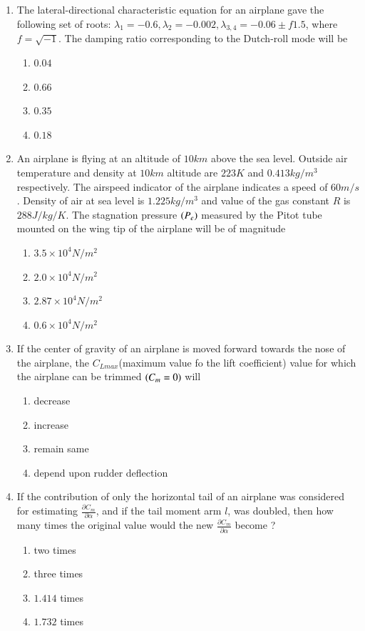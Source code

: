 \documentclass[journal]{IEEEtran}
\begin{document}
\begin{enumerate}
	\item The lateral-directional characteristic equation for an airplane gave the following set of roots: $\lambda _ 1 = -0.6, \lambda _ 2 = -0.002, \lambda _{3,4} = -0.06 \pm f1.5$, where $f = \sqrt{-1}$. The damping ratio corresponding to the Dutch-roll mode will be
		\begin{enumerate}
			\item $0.04$
			\item $0.66$
			\item $0.35$
			\item $0.18$
		\end{enumerate}

	\item An airplane is flying at an altitude of $10km$ above the sea level. Outside air temperature and density at $10km$ altitude are $223 K$ and $0.413 kg/ m^3 $ respectively. The airspeed indicator of the airplane indicates a speed of $60 m/s$. Density of air at sea level is $1.225 kg/m^3$ and value of the gas constant $R$ is $288 J/kg/K$. The stagnation pressure $\left(P_e\right)$ measured by the Pitot tube mounted on the wing tip of the airplane will be of magnitude
		\begin{enumerate}
			\item $3.5 \times 10^4 N/m^2$
			\item $2.0 \times 10^4 N/m^2$
			\item $2.87 \times 10^4 N/m^2$
			\item $0.6 \times 10^4 N/m^2$
		\end{enumerate}

	\item If the center of gravity of an airplane is moved forward towards the nose of the airplane, the $C_{L max}$(maximum value fo the lift coefficient) value for which the airplane can be trimmed $\left(C_m = 0\right)$ will
		\begin{enumerate}
			\item decrease
			\item increase
			\item remain same
			\item depend upon rudder deflection
		\end{enumerate}

	\item If the contribution of only the horizontal tail of an airplane was considered for estimating $\frac{\partial C_m}{\partial \alpha}$, and if the tail moment arm $l$, was doubled, then how many times the original value would the new $\frac{\partial C_m}{\partial \alpha}$ become ?
		\begin{enumerate}
			\item two times
			\item three times
			\item $1.414$ times
			\item $1.732$ times
		\end{enumerate}


\end{enumerate}
\end{document}
